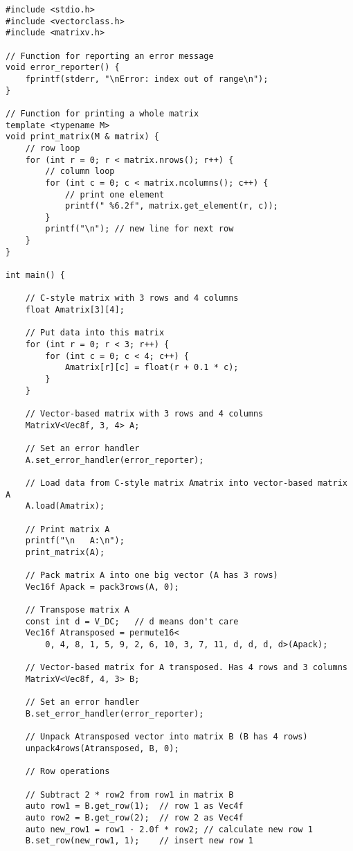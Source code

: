 \documentclass[11pt,a4paper,oneside,openright]{report}
\begin{document}
\begin{lstlisting}[frame=none]
#include <stdio.h>
#include <vectorclass.h>
#include <matrixv.h>

// Function for reporting an error message
void error_reporter() {
    fprintf(stderr, "\nError: index out of range\n");
}

// Function for printing a whole matrix
template <typename M>
void print_matrix(M & matrix) {
    // row loop
    for (int r = 0; r < matrix.nrows(); r++) {
        // column loop
        for (int c = 0; c < matrix.ncolumns(); c++) {
            // print one element
            printf(" %6.2f", matrix.get_element(r, c));
        }
        printf("\n"); // new line for next row
    }
}

int main() {

    // C-style matrix with 3 rows and 4 columns
    float Amatrix[3][4];

    // Put data into this matrix
    for (int r = 0; r < 3; r++) {
        for (int c = 0; c < 4; c++) {
            Amatrix[r][c] = float(r + 0.1 * c);
        }
    }

    // Vector-based matrix with 3 rows and 4 columns
    MatrixV<Vec8f, 3, 4> A;

    // Set an error handler
    A.set_error_handler(error_reporter);

    // Load data from C-style matrix Amatrix into vector-based matrix A
    A.load(Amatrix);

    // Print matrix A
    printf("\n   A:\n");
    print_matrix(A);

    // Pack matrix A into one big vector (A has 3 rows)
    Vec16f Apack = pack3rows(A, 0);

    // Transpose matrix A
    const int d = V_DC;   // d means don't care
    Vec16f Atransposed = permute16<
        0, 4, 8, 1, 5, 9, 2, 6, 10, 3, 7, 11, d, d, d, d>(Apack);

    // Vector-based matrix for A transposed. Has 4 rows and 3 columns
    MatrixV<Vec8f, 4, 3> B;

    // Set an error handler
    B.set_error_handler(error_reporter);

    // Unpack Atransposed vector into matrix B (B has 4 rows)
    unpack4rows(Atransposed, B, 0);
    
    // Row operations

    // Subtract 2 * row2 from row1 in matrix B
    auto row1 = B.get_row(1);  // row 1 as Vec4f
    auto row2 = B.get_row(2);  // row 2 as Vec4f
    auto new_row1 = row1 - 2.0f * row2; // calculate new row 1
    B.set_row(new_row1, 1);    // insert new row 1


\end{lstlisting}
\end{document}
